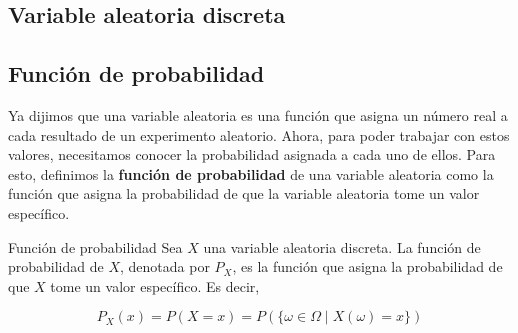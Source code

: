 \subsection{Variable aleatoria discreta}

\subsection{Función de probabilidad}

Ya dijimos que una variable aleatoria es una función que asigna un número real a cada resultado de un experimento
aleatorio. Ahora, para poder trabajar con estos valores, necesitamos conocer la probabilidad asignada a cada uno de
ellos. Para esto, definimos la \textbf{función de probabilidad} de una variable aleatoria como la función que asigna
la probabilidad de que la variable aleatoria tome un valor específico.

\begin{definicion}{Función de probabilidad}
    Sea $X$ una variable aleatoria discreta. La función de probabilidad de $X$, denotada por $P_X$, es la función
    que asigna la probabilidad de que $X$ tome un valor específico. Es decir,

    $$
        P_X(x) = P(X = x) = P(\{\omega \in \Omega \mid X(\omega) = x\})
    $$
\end{definicion}